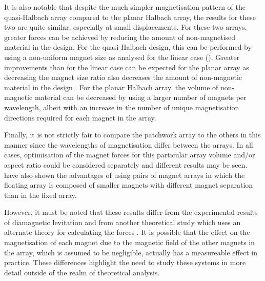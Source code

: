 \documentclass[11pt,a4paper]{memoir}
\begin{document}
It is also notable that despite the much simpler magnetisation pattern of the quasi-Halbach array compared to the planar Halbach array, the results for these two are quite similar, especially at small displacements.
For these two arrays, greater forces can be achieved by reducing the amount of non-magnetised material in the design.
For the quasi-Halbach design, this can be performed by using a non-uniform magnet size as analysed for the linear case ().
Greater improvements than for the linear case can be expected for the planar array as decreasing the magnet size ratio also decreases the amount of non-magnetic material in the design \cite{rovers2009-ietm,janssen2009-jsdd}.
For the planar Halbach array, the volume of non-magnetic material can be decreased by using a larger number of magnets per wavelength, albeit with an increase in the number of unique magnetisation directions required for each magnet in the array.

Finally, it is not strictly fair to compare the patchwork array to the others in this manner since the wavelengths of magnetisation differ between the arrays.
In all cases, optimisation of the magnet forces for this particular array volume and/or aspect ratio could be considered separately and different results may be seen.
\textcite{janssen2012-pier} have also shown the advantages of using pairs of magnet arrays in which the floating array is composed of smaller magnets with different magnet separation than in the fixed array.

However, it must be noted that these results differ from the experimental results of diamagnetic levitation \cite{moser2002-maglev} and from another theoretical study which uses an alternate theory for calculating the forces \cite{campbell2002}.
It is possible that the effect on the magnetisation of each magnet due to the magnetic field of the other magnets in the array, which is assumed to be negligible, actually has a measureable effect in practice.
These differences highlight the need to study these systems in more detail outside of the realm of theoretical analysis.

\begin{figure}
\begin{wide}
\hfil
{}
\end{wide}
\end{figure}
\end{document}
